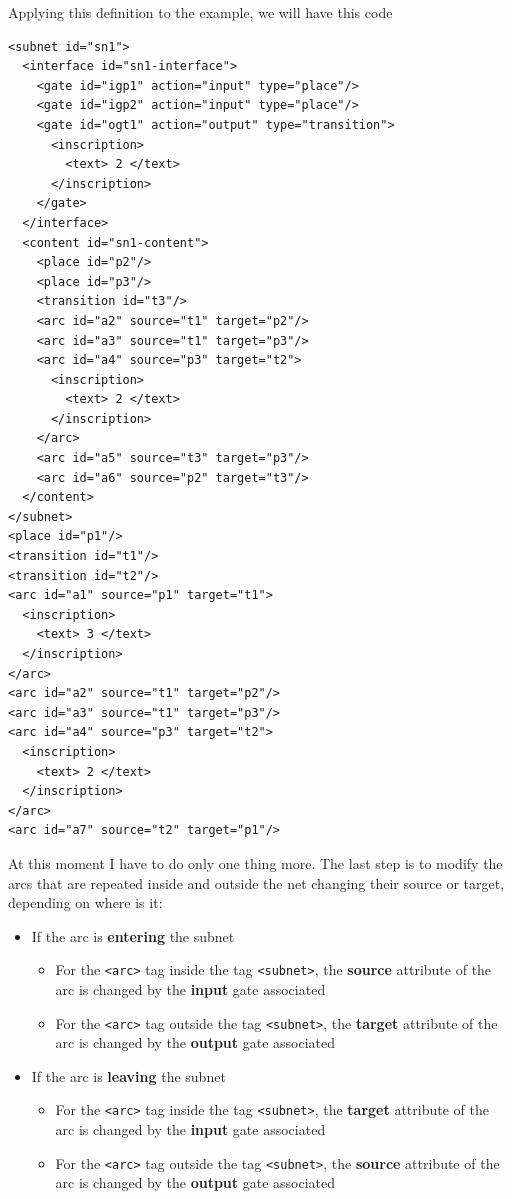 \begin{enumerate}
Applying this definition to the example, we will have this code

\begin{lstlisting}
<subnet id="sn1">
  <interface id="sn1-interface">
    <gate id="igp1" action="input" type="place"/>
    <gate id="igp2" action="input" type="place"/>
    <gate id="ogt1" action="output" type="transition">
      <inscription>
        <text> 2 </text>
      </inscription>
    </gate>
  </interface>
  <content id="sn1-content">
    <place id="p2"/>
    <place id="p3"/>
    <transition id="t3"/>
    <arc id="a2" source="t1" target="p2"/>
    <arc id="a3" source="t1" target="p3"/>
    <arc id="a4" source="p3" target="t2">
      <inscription>
        <text> 2 </text>
      </inscription>
    </arc>
    <arc id="a5" source="t3" target="p3"/>
    <arc id="a6" source="p2" target="t3"/>
  </content>
</subnet>
<place id="p1"/>
<transition id="t1"/>
<transition id="t2"/>
<arc id="a1" source="p1" target="t1">
  <inscription>
    <text> 3 </text>
  </inscription>
</arc>
<arc id="a2" source="t1" target="p2"/>
<arc id="a3" source="t1" target="p3"/>
<arc id="a4" source="p3" target="t2">
  <inscription>
    <text> 2 </text>
  </inscription>
</arc>
<arc id="a7" source="t2" target="p1"/>
\end{lstlisting}

At this moment I have to do only one thing more. The last step is to modify
the arcs that are repeated inside and outside the net changing their source or target, depending on where is it:

\begin{itemize}
\item If the arc is \textbf{entering} the subnet
  \begin{itemize}
  \item For the \texttt{\textless arc\textgreater} tag inside the tag \texttt{\textless subnet\textgreater}, the \textbf{source} attribute of the arc is changed by the \textbf{input} gate associated
  \item For the \texttt{\textless arc\textgreater} tag outside the tag \texttt{\textless subnet\textgreater}, the \textbf{target} attribute of the arc is changed by the \textbf{output} gate associated
  \end{itemize}
\item If the arc is \textbf{leaving} the subnet
  \begin{itemize}
  \item For the \texttt{\textless arc\textgreater} tag inside the tag \texttt{\textless subnet\textgreater}, the \textbf{target} attribute of the arc is changed by the \textbf{input} gate associated
  \item For the \texttt{\textless arc\textgreater} tag outside the tag \texttt{\textless subnet\textgreater}, the \textbf{source} attribute of the arc is changed by the \textbf{output} gate associated
  \end{itemize}
\end{itemize}


\end{enumerate}
